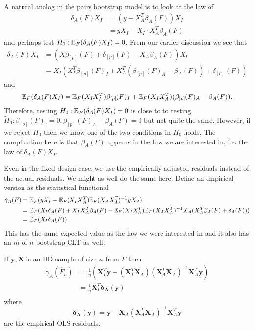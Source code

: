 \documentclass{article}
\begin{document}
A natural analog
in the pairs bootstrap model is to look at the law of
$$
\begin{aligned}
\delta_A(F) X_I &= (y-X_A^T\beta_A(F)) X_I \\
&= yX_I - X_I \cdot X_A^T\beta_A(F)
\end{aligned}
$$
and perhaps test $H_0:\mathbb{E}_F(\delta_A(F)X_I)=0$.
From our earlier discussion we see that
$$
\begin{aligned}
\delta_A(F)X_I &= (X\beta_{[p]}(F) + \delta_{[p]}(F) - X_A\beta_A(F))X_I \\
&= X_I(X_I^T\beta_{[p]}(F)_I + X_A^T(\beta_{[p]}(F)_A - \beta_A(F))  + \delta_{[p]}(F))
\end{aligned}
$$
and
$$
\mathbb{E}_F(\delta_A(F)X_I) = \mathbb{E}_F(X_IX_I^T)\beta_{[p]}(F)_I + \mathbb{E}_F(X_IX_A^T)(\beta_{[p]}(F)_A - \beta_A(F)).
$$
Therefore, testing $H_0:\mathbb{E}_F(\delta_A(F)X_I)=0$ is close to
to testing $\tilde{H}_0:\beta_{[p]}(F)_I=0, \beta_{[p]}(F)_A-\beta_A(F)=0$ but not
quite the same. However, if we reject $H_0$ then we know one of the
two conditions in $\tilde{H}_0$ holds.
The complication here is that $\beta_A(F)$ appears in the law
we are interested in, i.e. the law of $\delta_A(F)X_I$.  

Even in the fixed design case, we use the empirically adjusted residuals
instead of the actual residuals. We might as well do the same here.
Define an empirical version as the statistical functional
$$
\begin{aligned}
\tilde{\gamma}_{A}(F) &= \mathbb{E}_F(yX_I - \mathbb{E}_F(X_I X_A^T) \mathbb{E}_F(X_AX_A^T)^{-1} yX_A) \\
&= \mathbb{E}_F(X_I \delta_A(F) + X_IX_A^T\beta_A(F) - \mathbb{E}_F(X_I X_A^T) \mathbb{E}_F(X_AX_A^T)^{-1} X_A(X_A^T\beta_A(F) + \delta_A(F))) \\
&= \mathbb{E}_F(X_I \delta_A(F)).
\end{aligned}
$$
This has the same expected value as 
the law we were interested in and it also has an $m$-of-$n$ bootstrap CLT as well.

If $\mathbf{y}, \mathbf{X}$ is an IID sample of size $n$ from $F$ then
$$
\begin{aligned}
\tilde{\gamma}_A(\hat{F}_n) &= \frac{1}{n} \left(\mathbf{X}_I^T\mathbf{y} - \left(\mathbf{X}_I^T\mathbf{X}_A \right) \left(\mathbf{X}_A^T\mathbf{X}_A \right)^{-1} \mathbf{X}_A^T\mathbf{y} \right) \\
 &= \frac{1}{n}\mathbf{X}_I^T\mathbf{\delta_A(y)} \\
\end{aligned}
$$
where
$$
\mathbf{\delta_A(y)} = \mathbf{y} - \mathbf{X}_A \left(\mathbf{X}_A^T\mathbf{X}_A \right)^{-1} \mathbf{X}_A^T\mathbf{y}
$$
are the empirical OLS residuals. 
\end{document}
